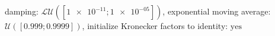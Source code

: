 damping: $\mathcal{LU}([\num[scientific-notation=true]{1e-11}; \num[scientific-notation=true]{1e-05}])$, exponential moving average: $\mathcal{U}([\num[scientific-notation=true]{0.999}; \num[scientific-notation=true]{0.9999}])$, initialize Kronecker factors to identity: $\text{yes}$